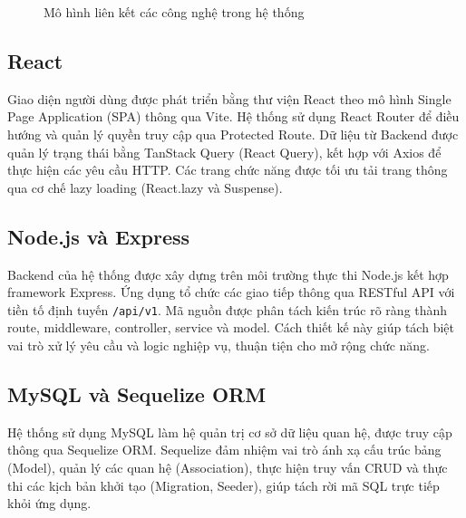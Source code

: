 \documentclass[12pt, a4paper]{report}
\begin{document}
\begin{figure}[htbp]
{
    }
    \caption{Mô hình liên kết các công nghệ trong hệ thống}
    \label{fig:cac_cong_nghe}
\end{figure}

\subsection{React}
Giao diện người dùng được phát triển bằng thư viện React theo mô hình Single Page Application (SPA) thông qua Vite. Hệ thống sử dụng React Router để điều hướng và quản lý quyền truy cập qua Protected Route. Dữ liệu từ Backend được quản lý trạng thái bằng TanStack Query (React Query), kết hợp với Axios để thực hiện các yêu cầu HTTP. Các trang chức năng được tối ưu tải trang thông qua cơ chế lazy loading (React.lazy và Suspense).

\subsection{Node.js và Express}
Backend của hệ thống được xây dựng trên môi trường thực thi Node.js kết hợp framework Express. Ứng dụng tổ chức các giao tiếp thông qua RESTful API với tiền tố định tuyến \texttt{/api/v1}. Mã nguồn được phân tách kiến trúc rõ ràng thành route, middleware, controller, service và model. Cách thiết kế này giúp tách biệt vai trò xử lý yêu cầu và logic nghiệp vụ, thuận tiện cho mở rộng chức năng.

\subsection{MySQL và Sequelize ORM}
Hệ thống sử dụng MySQL làm hệ quản trị cơ sở dữ liệu quan hệ, được truy cập thông qua Sequelize ORM. Sequelize đảm nhiệm vai trò ánh xạ cấu trúc bảng (Model), quản lý các quan hệ (Association), thực hiện truy vấn CRUD và thực thi các kịch bản khởi tạo (Migration, Seeder), giúp tách rời mã SQL trực tiếp khỏi ứng dụng.
\end{document}
